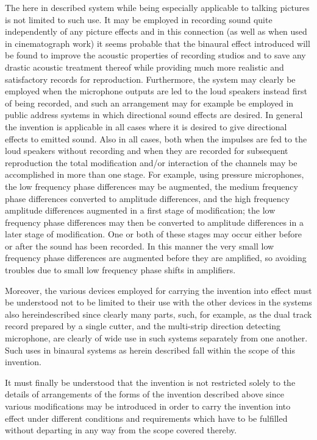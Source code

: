 \documentclass[11pt]{article}
\begin{document}
\begin{multicols*}{2}
The here in described system while being especially applicable to talking pictures is not limited to such use. It may be employed in recording sound quite independently of any picture effects and in this connection (as well as when used in cinematograph work) it seems probable that the binaural effect introduced will be found to improve the acoustic properties of recording studios and to save any drastic acoustic treatment thereof while providing much more realistic and satisfactory records for reproduction. Furthermore, the system may clearly be employed when the microphone outputs are led to the loud speakers instead first of being recorded, and such an arrangement may for example be employed in public address systems in which directional sound effects are desired. In general the invention is applicable in all cases where it is desired to give directional effects to emitted sound. Also in all cases, both when the impulses are fed to the loud speakers without recording and when they are recorded for subsequent reproduction the total modification and/or interaction of the channels may be accomplished in more than one stage. For example, using pressure microphones, the low frequency phase differences may be augmented, the medium frequency phase differences converted to amplitude differences, and the high frequency amplitude differences augmented in a first stage of modification; the low frequency phase differences may then be converted to amplitude differences in a later stage of modification. One or both of these stages may occur either before or after the sound has been recorded. In this manner the very small low frequency phase differences are augmented before they are amplified, so avoiding troubles due to small low frequency phase shifts in amplifiers. 

Moreover, the various devices employed for carrying the invention into effect must be understood not to be limited to  their use with the other devices in the systems also hereindescribed since clearly many parts, such, for example, as the dual track record prepared by a single cutter, and the multi-strip direction detecting microphone, are clearly of wide use in such systems separately from one another. Such uses in binaural systems as herein described fall within the scope of this invention. 

It must finally be understood that the invention is not restricted solely to the details of arrangements of the forms of the invention described above since various modifications may be introduced in order to carry the invention into effect under different conditions and requirements which have to be fulfilled without departing in any way from the scope covered thereby.


\end{multicols*}
\end{document}
